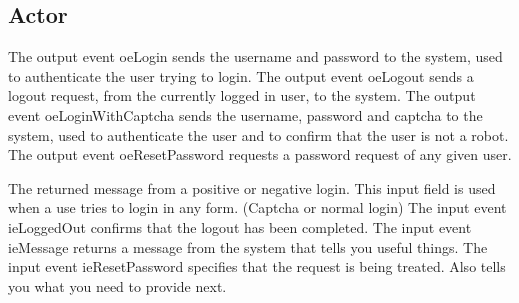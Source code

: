 \subsection{ Actor}


\begin{actortable}
	
	
	
	
	

			{The output event oeLogin sends the username and password to the system, used to authenticate the user trying to login.}
			{The output event oeLogout sends a logout request, from the currently logged in user, to the system.}
			{The output event oeLoginWithCaptcha sends the username, password and captcha to the system, used to authenticate the user and
			to confirm that the user is not a robot.}
			{The output event oeResetPassword requests a password request of any given user.}
	
							 {The returned message from a positive or negative login. This input field is used when a use tries to login in any form.
							 (Captcha or normal login)}
							 {The input event ieLoggedOut confirms that the logout has been completed.}
							 {The input event ieMessage returns a message from the system that tells you useful things.}
							 {The input event ieResetPassword specifies that the request is being treated. Also tells you what you need to provide next.}
	
\end{actortable}
